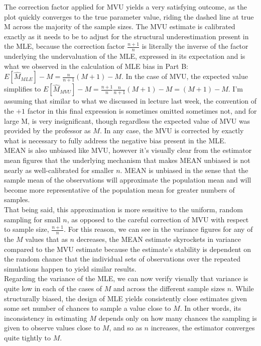 The correction factor applied for MVU yields a very satisfying outcome, as the plot quickly converges to the true parameter value, riding the dashed line at true M across the majority of the sample sizes. The MVU estimate is calibrated exactly as it needs to be to adjust for the structural underestimation present in the MLE, because the correction factor $ \frac{n+1}{n} $ is literally the inverse of the factor underlying the undervaluation of the MLE, expressed in its expectation and is what we observed in the calculation of MLE bias in Part B: $ E[\hat{M}_{MLE}] - M = \frac{n}{n+1}(M+1) - M $. In the case of MVU, the expected value simplifies to $ E[\hat{M}_{MVU}] - M = \frac{n+1}{n}\frac{n}{n+1}(M+1) - M = (M+1) - M $. I'm assuming that similar to what we discussed in lecture last week, the convention of the $ +1 $ factor in this final expression is sometimes omitted sometimes not, and for large M, is very insignificant, though regardless the expected value of MVU was provided by the professor as $ M $. In any case, the MVU is corrected by exactly what is necessary to fully address the negative bias present in the MLE.\\

MEAN is also unbiased like MVU, however it's visually clear from the estimator mean figures that the underlying mechanism that makes MEAN unbiased is not nearly as well-calibrated for smaller $ n $. MEAN is unbiased in the sense that the sample mean of the observations will approximate the population mean and will become more representative of the population mean for greater numbers of samples.\\

That being said, this approximation is more sensitive to the uniform, random sampling for small $ n $, as opposed to the careful correction of MVU with respect to sample size, $ \frac{n+1}{n} $. For this reason, we can see in the variance figures for any of the $ M $ values that as $ n $ decreases, the MEAN estimate skyrockets in variance compared to the MVU estimate because the estimate's stability is dependent on the random chance that the individual sets of observations over the repeated simulations happen to yield similar results.\\

Regarding the variance of the MLE, we can now verify visually that variance is quite low in each of the cases of $ M $ and across the different sample sizes $ n $. While structurally biased, the design of MLE yields consistently close estimates given some set number of chances to sample a value close to $ M $. In other words, its inconsistency in estimating $ M $ depends only on how many chances the sampling is given to observe values close to $ M $, and so as $ n $ increases, the estimator converges quite tightly to $ M $.

\newpage
